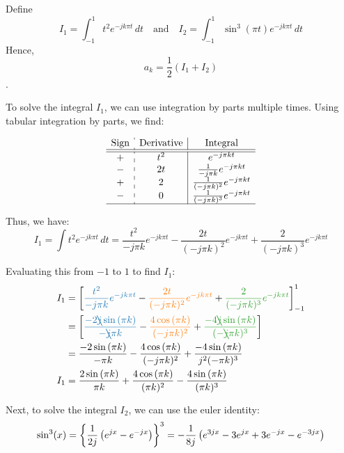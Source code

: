 \documentclass[a4paper, 10pt]{article}
\begin{document}
\begin{tosubmit}
Define \[ I_1 = \int_{-1}^{1} t^2 e^{-j k \pi t} \,dt \quad \text{and} \quad I_2 = \int_{-1}^{1} \sin^3(\pi t) e^{-j k \pi t} \,dt \]
Hence, \[ a_k = \frac{1}{2} (I_1 + I_2) \].

To solve the integral \( I_1 \), we can use integration by parts multiple times.
Using tabular integration by parts, we find:

\renewcommand{\arraystretch}{1.7}
\[
\begin{array}{c:c|c}
    \text{Sign} & \text{Derivative} & \text{Integral} \\
    \hline
    \hline
    + & t^2 & e^{-j \pi k t} \\
    - & 2t & \frac{1}{-j \pi k} e^{-j \pi k t} \\
    + & 2 & \frac{1}{(-j \pi k)^2} e^{-j \pi k t} \\
    - & 0 & \frac{1}{(-j \pi k)^3} e^{-j \pi k t} \\
    \hline
\end{array}
\]

Thus, we have:
\[ I_1 = \int t^2 e^{-j k \pi t} \,dt = \frac{t^2}{-j \pi k} e^{-j k \pi t} - \frac{2t}{(-j \pi k)^2} e^{-j k \pi t} + \frac{2}{(-j \pi k)^3} e^{-j k \pi t} \]

Evaluating this from \( -1 \) to \( 1 \) to find \( I_1 \):
\begin{align*}
    I_1 &= \sqbracket{ \textcolor[HTML]{1F77B4}{ \frac{t^2}{-j \pi k} e^{-j k \pi t} } - \textcolor[HTML]{FF7F0E}{ \frac{2t}{(-j \pi k)^2} e^{-j k \pi t} } + \textcolor[HTML]{2CA02C}{ \frac{2}{(-j \pi k)^3} e^{-j k \pi t} } }_{-1}^{1} \\
    &= \sqbracket{ \textcolor[HTML]{1F77B4}{ \frac{-2 \bcancel{j} \sin{(\pi k)}}{-\bcancel{j} \pi k} } - \textcolor[HTML]{FF7F0E}{ \frac{4 \cos{(\pi k)}}{(-j \pi k)^2} } + \textcolor[HTML]{2CA02C}{ \frac{-4 \bcancel{j} \sin{(\pi k)}}{(-\bcancel{j} \pi k)^3} } } \\
    &= \frac{-2 \sin{(\pi k)}}{-\pi k} - \frac{4 \cos{(\pi k)}}{(-j \pi k)^2} + \frac{-4 \sin{(\pi k)}}{j^2 (-\pi k)^3} \\
    I_1 &= \frac{2 \sin{(\pi k)}}{\pi k} + \frac{4 \cos{(\pi k)}}{(\pi k)^2} - \frac {4 \sin{(\pi k)}}{(\pi k)^3}
\end{align*}

Next, to solve the integral \( I_2 \), we can use the euler identity:
\[ \sin^3(x) = \left\{ \frac{1}{2j} \left( e^{jx} - e^{-jx} \right) \right\}^3 = -\frac{1}{8j} \left( e^{3jx} - 3e^{jx} + 3e^{-jx} - e^{-3jx} \right) \]

\newpage


\end{tosubmit}
\end{document}
